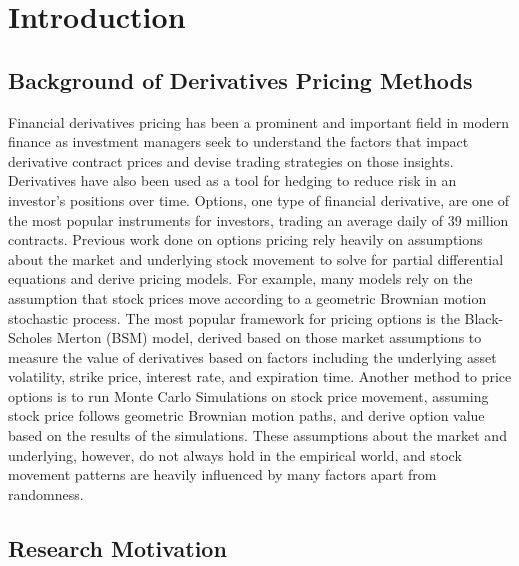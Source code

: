 \chapter{Introduction}

\section{Background of Derivatives Pricing Methods}

Financial derivatives pricing has been a prominent and important field in modern finance as investment managers seek to understand the factors that impact derivative contract prices and devise trading strategies on those insights. Derivatives have also been used as a tool for hedging to reduce risk in an investor's positions over time. Options, one type of financial derivative, are one of the most popular instruments for investors, trading an average daily of 39 million contracts. Previous work done on options pricing rely heavily on assumptions about the market and underlying stock movement to solve for partial differential equations and derive pricing models. For example, many models rely on the assumption that stock prices move according to a geometric Brownian motion stochastic process. The most popular framework for pricing options is the Black-Scholes Merton (BSM) model, derived based on those market assumptions to measure the value of derivatives based on factors including the underlying asset volatility, strike price, interest rate, and expiration time. Another method to price options is to run Monte Carlo Simulations on stock price movement, assuming stock price follows geometric Brownian motion paths, and derive option value based on the results of the simulations. These assumptions about the market and underlying, however, do not always hold in the empirical world, and stock movement patterns are heavily influenced by many factors apart from randomness.

\section{Research Motivation}

